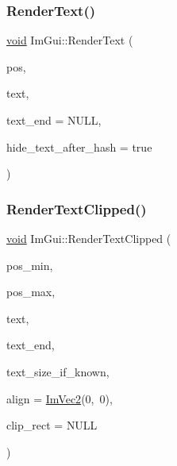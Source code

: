 \subsubsection{\texorpdfstring{Render\+Text()}{RenderText()}}
{\footnotesize\ttfamily \hyperlink{imgui__impl__opengl3__loader_8h_ac668e7cffd9e2e9cfee428b9b2f34fa7}{void} Im\+Gui\+::\+Render\+Text (\begin{DoxyParamCaption}\item[{\hyperlink{structImVec2}{Im\+Vec2}}]{pos,  }\item[{const char $\ast$}]{text,  }\item[{const char $\ast$}]{text\+\_\+end = {\ttfamily NULL},  }\item[{bool}]{hide\+\_\+text\+\_\+after\+\_\+hash = {\ttfamily true} }\end{DoxyParamCaption})}

\mbox{\label{namespaceImGui_ab362eafae794c7364a6b96ea06f38eb9}} 
\subsubsection{\texorpdfstring{Render\+Text\+Clipped()}{RenderTextClipped()}}
{\footnotesize\ttfamily \hyperlink{imgui__impl__opengl3__loader_8h_ac668e7cffd9e2e9cfee428b9b2f34fa7}{void} Im\+Gui\+::\+Render\+Text\+Clipped (\begin{DoxyParamCaption}\item[{const \hyperlink{structImVec2}{Im\+Vec2} \&}]{pos\+\_\+min,  }\item[{const \hyperlink{structImVec2}{Im\+Vec2} \&}]{pos\+\_\+max,  }\item[{const char $\ast$}]{text,  }\item[{const char $\ast$}]{text\+\_\+end,  }\item[{const \hyperlink{structImVec2}{Im\+Vec2} $\ast$}]{text\+\_\+size\+\_\+if\+\_\+known,  }\item[{const \hyperlink{structImVec2}{Im\+Vec2} \&}]{align = {\ttfamily \hyperlink{structImVec2}{Im\+Vec2}(0,~0)},  }\item[{const \hyperlink{structImRect}{Im\+Rect} $\ast$}]{clip\+\_\+rect = {\ttfamily NULL} }\end{DoxyParamCaption})}

\mbox{\label{namespaceImGui_a6ff0aaef091d39b0e2e2f6afeb647b34}} 
